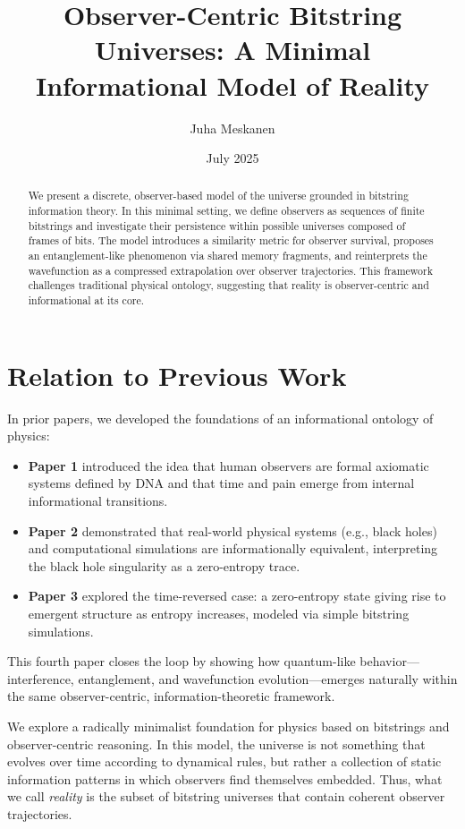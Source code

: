 \documentclass[12pt]{article}
\title{Observer-Centric Bitstring Universes: A Minimal Informational Model of Reality}
\author{Juha Meskanen}
\date{July 2025}
\begin{document}
\maketitle

\begin{abstract}
    We present a discrete, observer-based model of the universe grounded in bitstring information theory. In this minimal setting, we define observers as sequences of finite bitstrings and investigate their persistence within possible universes composed of frames of bits. The model introduces a similarity metric for observer survival, proposes an entanglement-like phenomenon via shared memory fragments, and reinterprets the wavefunction as a compressed extrapolation over observer trajectories. This framework challenges traditional physical ontology, suggesting that reality is observer-centric and informational at its core.

\end{abstract}


\section*{Relation to Previous Work}

In prior papers, we developed the foundations of an informational ontology of physics:

\begin{itemize}
    \item \textbf{Paper 1} introduced the idea that human observers are formal axiomatic systems defined by DNA and that time and pain emerge from internal informational transitions.
    \item \textbf{Paper 2} demonstrated that real-world physical systems (e.g., black holes) and computational simulations are informationally equivalent, interpreting the black hole singularity as a zero-entropy trace.
    \item \textbf{Paper 3} explored the time-reversed case: a zero-entropy state giving rise to emergent structure as entropy increases, modeled via simple bitstring simulations.
\end{itemize}

This fourth paper closes the loop by showing how quantum-like behavior—interference, entanglement, and wavefunction evolution—emerges naturally within the same observer-centric, information-theoretic framework.

We explore a radically minimalist foundation for physics based on bitstrings and observer-centric reasoning. In this model, the universe is not something that evolves over time according to dynamical rules, but rather a collection of static information patterns in which observers find themselves embedded. Thus, what we call \emph{reality} is the subset of bitstring universes that contain coherent observer trajectories.
\end{document}
